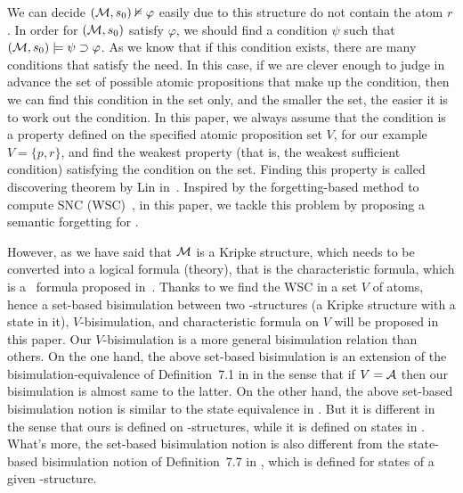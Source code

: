 \documentclass{article}
\begin{document}
We can decide $({\cal M}, s_0)\nvDash \varphi$ easily due to this structure do not contain the atom $r$.
In order for $({\cal M}, s_0)$ satisfy $\varphi$, we should find a condition $\psi$ such that $({\cal M}, s_0) \models \psi \supset \varphi$.
 As we know that if this condition exists, there are many conditions that satisfy the need.
In this case, if we are clever enough to judge in advance the set of possible atomic propositions that make up the condition, then we can find this condition in the set only, and the smaller the set, the easier it is to work out the condition.
In this paper, we always assume that the condition is a property defined on the specified atomic proposition set $V$, for our example $V=\{p,r\}$, and find the weakest property (that is, the weakest sufficient condition) satisfying the condition on the set. Finding this property is called discovering theorem by Lin in~\cite{DBLP:journals/aim/Lin18}.
Inspired by the forgetting-based method to compute SNC (WSC)~\cite{DBLP:journals/ai/Lin01}, in this paper, we tackle this problem by proposing a semantic forgetting for \CTL.

However, as we have said that ${\cal M}$ is a Kripke structure, which needs to be converted into a logical formula (theory), that is the characteristic formula, which is a \CTL\ formula proposed in~\cite{DBLP:journals/tcs/BrowneCG88}.
Thanks to we find the WSC in a set $V$ of atoms, hence a set-based bisimulation between two \MPK-structures (a Kripke structure with a state in it), $V$-bisimulation, and characteristic formula on $V$ will be proposed in this paper.
Our $V$-bisimulation is a more general bisimulation relation than others.
On the one hand, the above set-based bisimulation is an extension of the
bisimulation-equivalence of Definition~7.1 in \cite{Baier:PMC:2008} in the
sense that if $V=\cal A$ then our bisimulation is almost same to the
latter.
On the other hand, the above set-based bisimulation notion is similar to
the state equivalence in \cite{DBLP:journals/tcs/BrowneCG88}. But it is
different in the sense that ours is defined on \MPK-structures,
while it is defined on states in \cite{DBLP:journals/tcs/BrowneCG88}.
What's more, the set-based bisimulation notion is also different
from  the state-based bisimulation notion of Definition~7.7 in \cite{Baier:PMC:2008},
which is defined for states of a given \MPK-structure.
\end{document}
